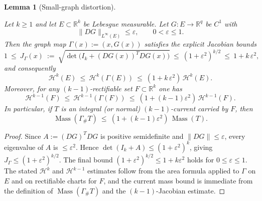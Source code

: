 \documentclass[11pt]{article}
\newcommand{\REVMZ}[1]{\textcolor{teal}{#1}}  %
\numberwithin{equation}{section}  %
\theoremstyle{plain}
\newtheorem{lemma}[theorem]{Lemma}
\theoremstyle{definition}
\theoremstyle{remark}
\newcommand{\R}{\mathbb{R}}
\DeclareMathOperator{\Mass}{Mass}
\begin{document}
\begin{lemma}[Small-graph distortion]\label{lem:small-graph-distortion}

{
Let $k\ge 1$ and let $E\subset \R^k$ be Lebesgue measurable.  Let $G:E\to \R^q$ be $C^1$ with
\[
\|DG\|_{L^\infty(E)}\le \varepsilon,\qquad 0<\varepsilon\le 1.
\]
Then the graph map $\Gamma(x):=(x,G(x))$ satisfies the explicit Jacobian bounds
\[
1 \ \le\ J_\Gamma(x)\ :=\ \sqrt{\det\bigl(I_k + (DG(x))^{\!T}DG(x)\bigr)}\ \le\ (1+\varepsilon^2)^{k/2}\ \le\ 1+k\,\varepsilon^2,
\]
and consequently
\[
\mathcal{H}^k(E)\ \le\ \mathcal{H}^k(\Gamma(E))\ \le\ (1+k\,\varepsilon^2)\,\mathcal{H}^k(E).
\]
Moreover, for any $(k-1)$-rectifiable set $F\subset \R^k$ one has
\[
\mathcal{H}^{k-1}(F)\ \le\ \mathcal{H}^{k-1}(\Gamma(F))\ \le\ (1+(k-1)\varepsilon^2)\,\mathcal{H}^{k-1}(F).
\]
In particular, if $T$ is an integral (or normal) $(k-1)$-current carried by $F$, then
\[
\Mass(\Gamma_\# T)\ \le\ (1+(k-1)\varepsilon^2)\,\Mass(T).
\]
}

\end{lemma}

\begin{proof}

{
Since $A:=(DG)^T DG$ is positive semidefinite and $\|DG\|\le \varepsilon$, every eigenvalue of $A$ is $\le \varepsilon^2$.
Hence $\det(I_k+A)\le (1+\varepsilon^2)^k$, giving $J_\Gamma\le (1+\varepsilon^2)^{k/2}$.  The final bound
$(1+\varepsilon^2)^{k/2}\le 1+k\varepsilon^2$ holds for $0\le \varepsilon\le 1$.
The stated $\mathcal{H}^k$ and $\mathcal{H}^{k-1}$ estimates follow from the area formula \REVMZ{\cite[3.2.3]{Fed69}} applied to $\Gamma$ on $E$ and on rectifiable charts for $F$,
and the current mass bound is immediate from the definition of $\Mass(\Gamma_\#T)$ and the $(k-1)$-Jacobian estimate.}

\end{proof}
\end{document}
